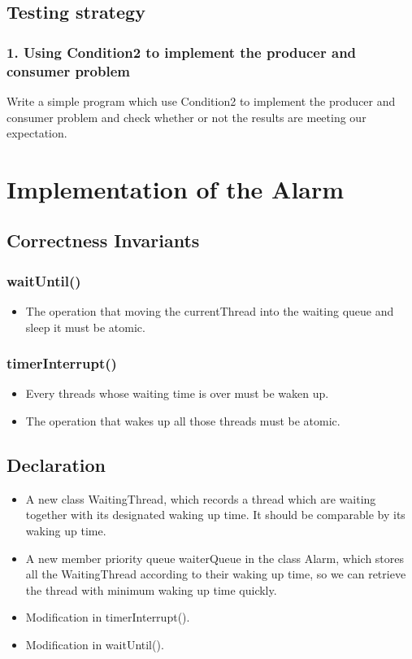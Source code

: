 \documentclass{article}
\begin{document}
	\subsection{Testing strategy}
	
	\subsubsection*{1. Using Condition2 to implement the producer and consumer problem}
	
	Write a simple program which use Condition2 to implement the producer and consumer problem and check whether or not the results are meeting our expectation.
%	
	\section{Implementation of the Alarm}
	
	\subsection{Correctness Invariants}
	
	\subsubsection*{waitUntil()}
	\begin{itemize}
		\item The operation that moving the currentThread into the waiting queue and sleep it must be atomic.
	\end{itemize}
	
	\subsubsection*{timerInterrupt()}
	\begin{itemize}
		\item Every threads whose waiting time is over must be waken up.
		
		\item The operation that wakes up all those threads must be atomic.
	\end{itemize}
	
	\subsection{Declaration}
	
	\begin{itemize}
		\item A new class WaitingThread, which records a thread which are waiting together with its designated waking up time. It should be comparable by its waking up time.
		
		\item A new member priority queue waiterQueue in the class Alarm, which stores all the WaitingThread according to their waking up time, so we can retrieve the thread with minimum waking up time quickly.
		
		\item Modification in timerInterrupt().
		
		\item Modification in waitUntil().
	\end{itemize}
	
\end{document}
